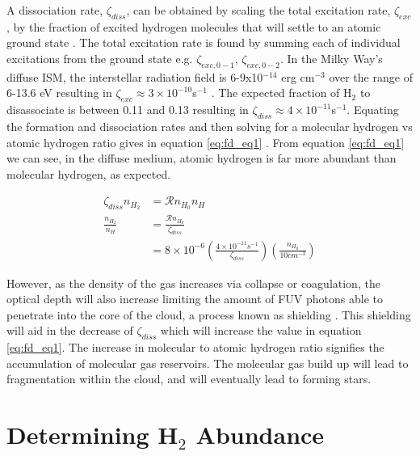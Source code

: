 A dissociation rate, $\zeta_{diss}$, can be obtained by scaling the total excitation rate, $\zeta_{exc}$, by the fraction of excited hydrogen molecules that will settle to an atomic ground state \citep{krumholz2014}.  The total excitation rate is found by summing each of individual excitations from the ground state e.g. $\zeta_{exc,0-1}$, $\zeta_{exc,0-2}$.  In the Milky Way's diffuse ISM, the interstellar radiation field is 6-9x10$^{-14}$ erg cm$^{-3}$ over the range of 6-13.6 eV resulting in $\zeta_{exc} \approx 3\times10^{-10}$s$^{-1}$ \citep{draine2011}.  The expected fraction of H$_2$ to disassociate is between 0.11 and 0.13 resulting in $\zeta_{diss}\approx4\times10^{-11}$s$^{-1}$\citep{draine2011}.
Equating the formation and dissociation rates and then solving for a molecular hydrogen vs atomic hydrogen ratio gives in equation \ref{eq:fd_eq1} \citep{krumholz2014}.  From equation \ref{eq:fd_eq1} we can see, in the diffuse medium, atomic hydrogen is far more abundant than molecular hydrogen, as expected.

\begin{equation}\label{eq:fd_eq1}
  \begin{split}
    \zeta_{diss} n_{H_2} & = \mathcal{R}n_{H_0}n_H \\
    \frac{n_{H_2}}{n_H} & = \frac{\mathcal{R}n_{H_0}}{\zeta_{diss}} \\
                        & = 8\times10^{-6}\left(\frac{4\times10^{-11}s^{-1}}{\zeta_{diss}}\right)\left(\frac{n_{H_0}}{10cm^{-3}}\right)
  \end{split}
\end{equation}

However, as the density of the gas increases via collapse or coagulation, the optical depth will also increase limiting the amount of FUV photons able to penetrate into the core of the cloud, a process known as shielding \citep{draine2011}.  This shielding will aid in the decrease of $\zeta_{diss}$ which will increase the value in equation \ref{eq:fd_eq1}.  The increase in molecular to atomic hydrogen ratio signifies the accumulation of molecular gas reservoirs.  The molecular gas build up will lead to fragmentation within the cloud, and will eventually lead to forming stars.  

\section{Determining H$_2$ Abundance}

